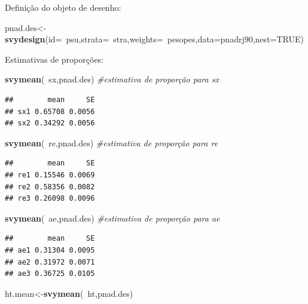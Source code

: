 \documentclass[]{book}
\newenvironment{Shaded}{\begin{snugshade}}{\end{snugshade}}
\newcommand{\KeywordTok}[1]{\textcolor[rgb]{0.13,0.29,0.53}{\textbf{{#1}}}}
\newcommand{\DataTypeTok}[1]{\textcolor[rgb]{0.13,0.29,0.53}{{#1}}}
\newcommand{\CommentTok}[1]{\textcolor[rgb]{0.56,0.35,0.01}{\textit{{#1}}}}
\newcommand{\OtherTok}[1]{\textcolor[rgb]{0.56,0.35,0.01}{{#1}}}
\newcommand{\NormalTok}[1]{{#1}}
\numberwithin{example}{chapter}
\numberwithin{remark}{chapter}
\numberwithin{definition}{chapter}
\begin{document}
Definição do objeto de desenho:

\begin{Shaded}
\begin{Highlighting}[]
\NormalTok{pnad.des<-}\KeywordTok{svydesign}\NormalTok{(}\DataTypeTok{id=}\NormalTok{~psu,}\DataTypeTok{strata=}\NormalTok{~stra,}\DataTypeTok{weights=}\NormalTok{~pesopes,}\DataTypeTok{data=}\NormalTok{pnadrj90,}\DataTypeTok{nest=}\OtherTok{TRUE}\NormalTok{)}
\end{Highlighting}
\end{Shaded}

Estimativas de proporções:

\begin{Shaded}
\begin{Highlighting}[]
\KeywordTok{svymean}\NormalTok{(~sx,pnad.des)         }\CommentTok{#estimativa de proporção para sx}
\end{Highlighting}
\end{Shaded}

\begin{verbatim}
##        mean     SE
## sx1 0.65708 0.0056
## sx2 0.34292 0.0056
\end{verbatim}

\begin{Shaded}
\begin{Highlighting}[]
\KeywordTok{svymean}\NormalTok{(~re,pnad.des)         }\CommentTok{#estimativa de proporçâo para re}
\end{Highlighting}
\end{Shaded}

\begin{verbatim}
##        mean     SE
## re1 0.15546 0.0069
## re2 0.58356 0.0082
## re3 0.26098 0.0096
\end{verbatim}

\begin{Shaded}
\begin{Highlighting}[]
\KeywordTok{svymean}\NormalTok{(~ae,pnad.des)         }\CommentTok{#estimativa de proporção para ae}
\end{Highlighting}
\end{Shaded}

\begin{verbatim}
##        mean     SE
## ae1 0.31304 0.0095
## ae2 0.31972 0.0071
## ae3 0.36725 0.0105
\end{verbatim}

\begin{Shaded}
\begin{Highlighting}[]
\NormalTok{ht.mean<-}\KeywordTok{svymean}\NormalTok{(~ht,pnad.des)}
\end{Highlighting}
\end{Shaded}
\end{document}
